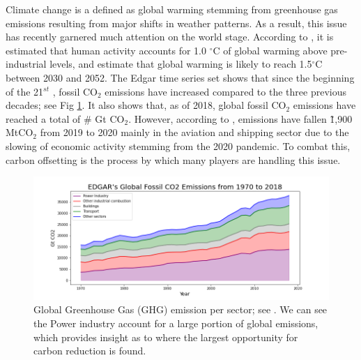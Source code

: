 \documentclass{article}
\begin{document}
Climate change is a defined as global warming stemming from greenhouse gas emissions resulting from major shifts in weather patterns. As a result, this issue has recently garnered much attention on the world stage. According to \cite{Glo21}, it is estimated that human activity accounts for 1.0 $^\circ$C of global warming above pre-industrial levels, and estimate that global warming is likely to reach 1.5$^\circ$C between 2030 and 2052. The Edgar time series set shows that since the beginning of the 21$^{st}$ \cite{EDGAR19}, fossil CO$_{2}$ emissions have increased compared to the three previous decades; see Fig \ref{fig:edgars_co2_emissions}. It also shows that, as of 2018, global fossil CO$_{2}$ emissions have reached a total of \# Gt CO$_{2}$. However, according to \cite{Liu20}, emissions have fallen \~ 1,900 MtCO$_{2}$ from 2019 to 2020 mainly in the aviation and shipping sector due to the slowing of economic activity stemming from the 2020 pandemic. To combat this, carbon offsetting is the process by which many players are handling this issue. 

\begin{figure}[h]
\centering
\includegraphics[width=5in]{edgars_co2_emissions.png}
\caption{Global Greenhouse Gas (GHG) emission per sector; see \cite{EDGAR19}. We can see the Power industry account for a large portion of global emissions, which provides insight as to where the largest opportunity for carbon reduction is found.} 
\label{fig:edgars_co2_emissions}
\end{figure} 
\end{document}
